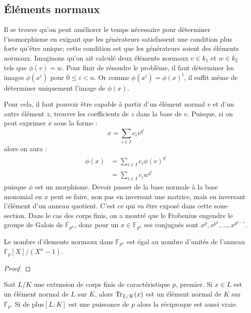 \documentclass[a4paper]{article} %
\numberwithin{section}{part}
\numberwithin{equation}{section}
\newcommand\GF[1]{\mathbb{F}_{#1}}
\begin{document}
\subsection{Éléments normaux}
\label{sec:elemnorm}
Il se trouve qu'on peut améliorer le temps nécessaire pour déterminer
l'isomorphisme en exigant que les générateurs satisfassent une condition plus 
forte qu'être unique; cette condition est que les générateurs soient des 
éléments normaux. Imaginons qu'on ait calculé deux éléments normaux $v\in k_1$ 
et $w\in k_2$ tels que $\phi(v) = w$. Pour finir de résoudre le problème, il 
faut déterminer les images $\phi(x^i)$ pour $0\leq i < n$. Or comme $\phi(x^i) =
\phi(x)^i$, il suffit même de déterminer uniquement l'image de $\phi(x)$.\par
Pour cela, il faut pouvoir être capable à partir d'un élément normal $v$ et d'un
autre élément $z$, trouver les coefficients de $z$ dans la base de $v$. Puisque,
si on peut exprimer $x$ sous la forme :
\[x = \sum_{i\in I}{c_iv^{q^i}}\]
alors on aura :
\begin{align*}
\phi(x) &= \sum_{i\in I}{c_i\phi(v)^{q^i}}\\
&= \sum_{i\in I}{c_iw^{q^i}}
\end{align*}
puisque $\phi$ est un morphisme. Devoir passer de la base normale à la base 
monomial en $x$ peut se faire, non pas en inversant une matrice, mais en 
inversant l'élément d'un anneau quotient. C'est ce qui va être exposé dans cette
sous-section. Dans le cas des corps finis, on a montré que le Frobenius engendre
le groupe de Galois de $\GF{p^n}$, donc pour un $x\in\GF{p^n}$ ses conjugués 
sont $x^p, x^{p^2},\dots,x^{p^{n-1}}$. 
\begin{thm}
\label{th:nbelemnorm}
Le nombre d'élements normaux dans $\GF{p^n}$ est égal au nombre d'unités de
l'anneau $\GF{p}[X]/(X^n - 1)$.
\end{thm}
\begin{proof}
\end{proof}
\begin{cor}
\label{cor:tracenorm}
Soit $L/K$ une extension de corps finis de caractéristique $p$, premier. Si
$x\in L$ est un élément normal de $L$ sur $K$, alors $\textup{Tr}_{L/K}(x)$ est 
un élément normal de $K$ sur $\GF{p}$. Si de plus$[L:K]$ est une puissance de 
$p$ alors la réciproque est aussi vraie.
\end{cor}
\end{document}
